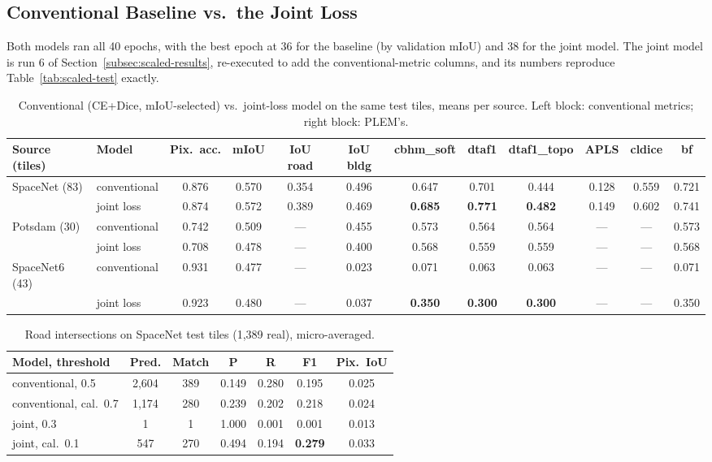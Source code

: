\subsection{Conventional Baseline vs.\ the Joint Loss}
\label{subsec:baseline-results}

Both models ran all 40 epochs, with the best epoch at 36 for the baseline (by validation mIoU) and
38 for the joint model. The joint model is run 6 of Section~\ref{subsec:scaled-results},
re-executed to add the conventional-metric columns, and its numbers reproduce
Table~\ref{tab:scaled-test} exactly.

\begin{table}
  \caption{Conventional (CE+Dice, mIoU-selected) vs.\ joint-loss model on the same test tiles,
  means per source. Left block: conventional metrics; right block: PLEM's.}
  \label{tab:baseline-test}
  \small
  \begin{tabular}{@{}llcccc|cccccc@{}}
    \toprule
    Source (tiles) & Model & Pix.\ acc. & mIoU & IoU road & IoU bldg & cbhm\_soft & dtaf1 &
      dtaf1\_topo & APLS & cldice & bf \\
    \midrule
    SpaceNet (83) & conventional & 0.876 & 0.570 & 0.354 & 0.496 & 0.647 & 0.701 & 0.444 & 0.128 & 0.559 & 0.721 \\
                  & joint loss   & 0.874 & 0.572 & 0.389 & 0.469 & \textbf{0.685} & \textbf{0.771} & \textbf{0.482} & 0.149 & 0.602 & 0.741 \\
    Potsdam (30)  & conventional & 0.742 & 0.509 & ---   & 0.455 & 0.573 & 0.564 & 0.564 & --- & --- & 0.573 \\
                  & joint loss   & 0.708 & 0.478 & ---   & 0.400 & 0.568 & 0.559 & 0.559 & --- & --- & 0.568 \\
    SpaceNet6 (43) & conventional & 0.931 & 0.477 & ---  & 0.023 & 0.071 & 0.063 & 0.063 & --- & --- & 0.071 \\
                   & joint loss   & 0.923 & 0.480 & ---  & 0.037 & \textbf{0.350} & \textbf{0.300} & \textbf{0.300} & --- & --- & 0.350 \\
    \bottomrule
  \end{tabular}
\end{table}

\begin{table}
  \caption{Road intersections on SpaceNet test tiles (1,389 real), micro-averaged.}
  \label{tab:baseline-points}
  \small
  \begin{tabular}{@{}lcccccc@{}}
    \toprule
    Model, threshold & Pred. & Match & P & R & F1 & Pix.\ IoU \\
    \midrule
    conventional, 0.5       & 2,604 & 389 & 0.149 & 0.280 & 0.195 & 0.025 \\
    conventional, cal.\ 0.7 & 1,174 & 280 & 0.239 & 0.202 & 0.218 & 0.024 \\
    joint, 0.3              & 1     & 1   & 1.000 & 0.001 & 0.001 & 0.013 \\
    joint, cal.\ 0.1        & 547   & 270 & 0.494 & 0.194 & \textbf{0.279} & 0.033 \\
    \bottomrule
  \end{tabular}
\end{table}

